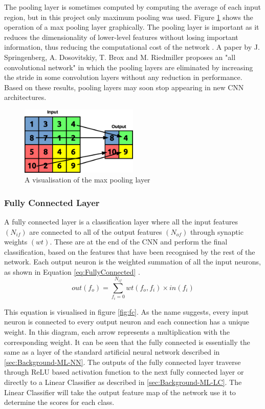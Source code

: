 \documentclass[12pt]{article}
\begin{document}
The pooling layer is sometimes computed by computing the average of each input region, but in this project only maximum pooling was used. Figure \ref{fig:pool} shows the operation of a max pooling layer graphically. The pooling layer is important as it reduces the dimensionality of lower-level features without losing important information, thus reducing the computational cost of the network \cite{SudaFpgaAccelerator}. A paper by J. Springenberg, A. Dosovitskiy, T. Brox and M. Riedmiller proposes an "all convolutional network" in which the pooling layers are eliminated by increasing the stride in some convolution layers without any reduction in performance\cite{AllConv}. Based on these results, pooling layers may soon stop appearing in new CNN architectures.

\begin{figure} [H]
\centering
\includegraphics[width=0.5\textwidth]{figures/pool.eps}
\caption{A visualisation of the max pooling layer}
\label{fig:pool}
\end{figure}

\subsubsection{Fully Connected Layer}
\label{sec:Background-CNN-FC}


A fully connected layer is a classification layer where all the input features $(N_{if})$ are connected to all of the output features $(N_{of})$ through synaptic weights $(wt)$. These are at the end of the CNN and perform the final classification, based on the features that have been recognised by the rest of the network. Each output neuron is the weighted summation of all the input neurons, as shown in Equation \ref{eq:FullyConnected} \cite{SudaFpgaAccelerator}.
\begin{equation}
out(f_o)=\sum^{N_{if}}_{f_i=0}wt(f_o,f_i)\times in(f_i)
\label{eq:FullyConnected}
\end{equation}

This equation is visualised in figure \ref{fig:fc}. As the name suggests, every input neuron is connected to every output neuron and each connection has a unique weight. In this diagram, each arrow represents a multiplication with the corresponding weight. It can be seen that the fully connected is essentially the same as a layer of the standard artificial neural network described in \ref{sec:Background-ML-NN}. The outputs of the fully connected layer traverse through ReLU based activation function to the next fully connected layer or directly to a Linear Classifier as described in \ref{sec:Background-ML-LC}. The Linear Classifier will take the output feature map of the network use it to determine the scores for each class.
\end{document}
